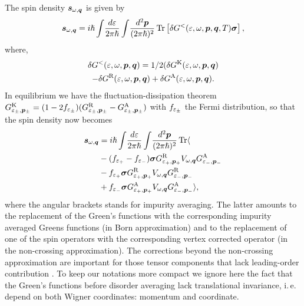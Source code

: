 The spin density $\boldsymbol{s}_{\omega,\boldsymbol{q}}$ is given by
\begin{equation}
    \boldsymbol{s}_{\omega,\boldsymbol{q}} = {i\hslash} \int\!\frac{d\varepsilon}{2\pi\hslash}\int\!\frac{d^2\boldsymbol{p}}{(2\pi\hslash)^2}\operatorname{Tr} \left[\delta G^<({\varepsilon,\omega,\boldsymbol{p},\boldsymbol{q}},T) \boldsymbol{\sigma}\right],
\end{equation}
where,
\begin{multline}
    \delta G^<(\varepsilon,\omega,\boldsymbol{p},\boldsymbol{q}) = 1/2 (\delta G^\text{K}(\varepsilon,\omega,\boldsymbol{p},\boldsymbol{q})\\-
    \delta G^\text{R}(\varepsilon,\omega,\boldsymbol{p},\boldsymbol{q})+\delta G^\text{A}(\varepsilon,\omega,\boldsymbol{p},\boldsymbol{q}).  
\end{multline}
In equilibrium we have the fluctuation-dissipation theorem $   G^\text{K}_{\varepsilon_\pm,\boldsymbol{p}_\pm} = (1-2f_{\varepsilon_\pm})(G^\text{R}_{\varepsilon_\pm,\boldsymbol{p}_\pm}-G^\text{A}_{\varepsilon_\pm,\boldsymbol{p}_\pm}) $ with $f_{\varepsilon_\pm}$ the Fermi distribution, so that the spin density now becomes
\begin{align}
    \boldsymbol{s}_{\omega,\boldsymbol{q}} &= {i\hslash} \int\!\frac{d\varepsilon}{2\pi\hslash}\int\!\frac{d^2\boldsymbol{p}}{(2\pi\hslash)^2}\operatorname{Tr}\langle\nonumber\\
    & -(f_{\varepsilon_+}-f_{\varepsilon_-})\boldsymbol{\sigma}G^\text{R}_{\varepsilon_+,\boldsymbol{p}_+} V_{\omega,\boldsymbol{q}}G^\text{A}_{\varepsilon_-,\boldsymbol{p}_-}\nonumber\\
    &-f_{\varepsilon_+}\boldsymbol{\sigma}G^\text{R}_{\varepsilon_+,\boldsymbol{p}_+} V_{\omega,\boldsymbol{q}}G^\text{R}_{\varepsilon_-,\boldsymbol{p}_-}\nonumber\\
    &+f_{\varepsilon_-}\boldsymbol{\sigma}G^\text{A}_{\varepsilon_+,\boldsymbol{p}_+} V_{\omega,\boldsymbol{q}}G^\text{A}_{\varepsilon_-,\boldsymbol{p}_-}\rangle,
\end{align}
where the angular brackets stands for impurity averaging. The latter amounts to the replacement of the Green's functions with the corresponding impurity averaged Greens functions (in Born approximation) and to the replacement of one of the spin operators with the corresponding vertex corrected operator (in the non-crossing approximation). The corrections beyond the non-crossing approximation are important for those tensor components that lack leading-order contribution \cite{ivan}. To keep our notations more compact we ignore here the fact that the Green's functions before disorder averaging lack translational invariance, i.\,e. depend on both Wigner coordinates: momentum and coordinate. 

